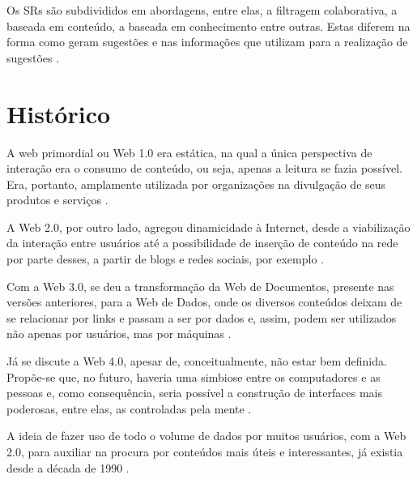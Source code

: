 Os SRs são subdivididos em abordagens, entre elas, a filtragem colaborativa, a baseada em conteúdo, a baseada em conhecimento entre outras. Estas diferem na forma como geram sugestões e nas informações que utilizam para a realização de sugestões \cite{Jannach2010}. 

\section{Histórico}

A web primordial ou Web 1.0 era estática, na qual a única perspectiva de interação era o consumo de conteúdo, ou seja, apenas a leitura se fazia possível. Era, portanto, amplamente utilizada por organizações na divulgação de seus produtos e serviços \cite{Aghaei2012}. 

A Web 2.0, por outro lado, agregou dinamicidade à Internet, desde a viabilização da interação entre usuários até a possibilidade de inserção de conteúdo na rede por parte desses, a partir de blogs e redes sociais, por exemplo \cite{Nath2014}.

Com a Web 3.0, se deu a transformação da Web de Documentos, presente nas versões anteriores, para a Web de Dados, onde os diversos conteúdos deixam de se relacionar por links e passam a ser por dados e, assim, podem ser utilizados não apenas por usuários, mas por máquinas \cite{Aghaei2012}.
 

Já se discute a Web 4.0, apesar de, conceitualmente, não estar bem definida. Propõe-se que, no futuro, haveria uma simbiose entre os computadores e as pessoas e, como consequência, seria possível a construção de interfaces mais poderosas, entre elas, as controladas pela mente \cite{Aghaei2012}.

A ideia de fazer uso de todo o volume de dados por muitos usuários, com a Web 2.0, para auxiliar na procura por conteúdos mais úteis e interessantes, já existia desde a década de 1990 \cite{Jannach2010}.

